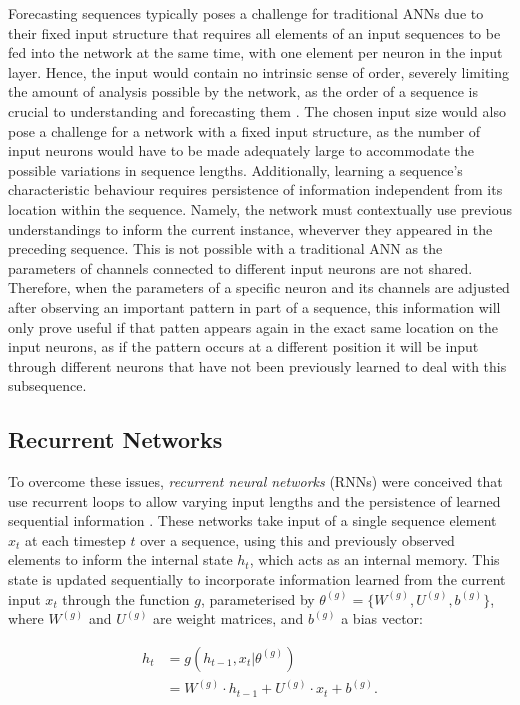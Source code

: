 \documentclass[a4paper, 11pt]{report}
\begin{document}
    Forecasting sequences typically poses a challenge for traditional ANNs due to their fixed input structure that requires all elements of an input sequences to be fed into the network at the same time, with one element per neuron in the input layer. Hence, the input would contain no intrinsic sense of order, severely limiting the amount of analysis possible by the network, as the order of a sequence is crucial to understanding and forecasting them \citep{tsantekidis-2022}. The chosen input size would also pose a challenge for a network with a fixed input structure, as the number of input neurons would have to be made adequately large to accommodate the possible variations in sequence lengths. Additionally, learning a sequence's characteristic behaviour requires persistence of information independent from its location within the sequence. Namely, the network must contextually use previous understandings to inform the current instance, wheverver they appeared in the preceding sequence. This is not possible with a traditional ANN as the parameters of channels connected to different input neurons are not shared. Therefore, when the parameters of a specific neuron and its channels are adjusted after observing an important pattern in part of a sequence, this information will only prove useful if that patten appears again in the exact same location on the input neurons, as if the pattern occurs at a different position it will be input through different neurons that have not been previously learned to deal with this subsequence.


    \subsection{Recurrent Networks}

    To overcome these issues, \emph{recurrent neural networks} (RNNs) were conceived that use recurrent loops to allow varying input lengths and the persistence of learned sequential information \citep{sharma-2022}. These networks take input of a single sequence element $x_t$ at each timestep $t$ over a sequence, using this and previously observed elements to inform the internal state $h_t$, which acts as an internal memory. This state is updated sequentially to incorporate information learned from the current input $x_t$ through the function $g$, parameterised by $\theta^{(g)} = \{ W^{(g)}, U^{(g)}, b^{(g)} \}$, where $W^{(g)}$ and $U^{(g)}$ are weight matrices, and $b^{(g)}$ a bias vector\citep{sharma-2022}:

    \begin{align}
        \label{eq: rnn-state}
        h_t &= g( h_{t-1}, x_t \vert \theta^{(g)} ) \\
        &= W^{(g)} \cdot h_{t-1} + U^{(g)} \cdot x_t + b^{(g)}
        \text{.}
    \end{align}
\end{document}
